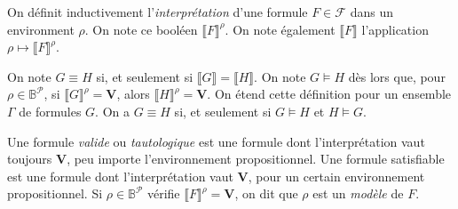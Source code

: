 \begin{multicols}{2}
	\begin{recap-box}
		On définit inductivement l'\textit{interprétation} d'une formule $F \in \mathcal{F}$\/ dans un environment $\rho$. On note ce booléen $\llbracket F \rrbracket^\rho$.
		On note également $\llbracket F \rrbracket$\/ l'application $\rho \mapsto \llbracket F \rrbracket^\rho$.
	\end{recap-box}
	\begin{recap-box}
		On note $G \equiv H$\/ si, et seulement si $\llbracket G \rrbracket = \llbracket H \rrbracket$.
		On note $G \models H$\/ dès lors que, pour $\rho \in \mathds{B}^\mathcal{P}$, si $\llbracket G \rrbracket^\rho = \mathbf{V}$, alors $\llbracket H \rrbracket^\rho = \mathbf{V}$.
		On étend cette définition pour un ensemble $\Gamma$\/ de formules $G$.
		On a $G \equiv H$\/ si, et seulement si $G \models H$\/ et $H \models G$.
	\end{recap-box}
	\begin{recap-box}
		Une formule \textit{valide} ou \textit{tautologique} est une formule dont l'interprétation vaut toujours $\mathbf{V}$, peu importe l'environnement propositionnel.
		Une formule satisfiable est une formule dont l'interprétation vaut $\mathbf{V}$, pour un certain environnement propositionnel.
		Si $\rho \in \mathds{B}^\mathcal{P}$\/ vérifie $\llbracket F \rrbracket^\rho = \mathbf{V}$, on dit que $\rho$\/ est un \textit{modèle} de $F$.
	\end{recap-box}
\end{multicols}
